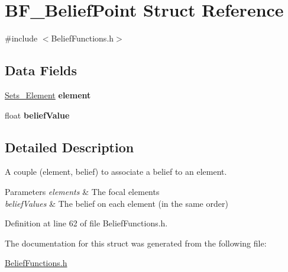 \hypertarget{struct_b_f___belief_point}{
\section{BF\_\-BeliefPoint Struct Reference}
\label{struct_b_f___belief_point}
}


{\ttfamily \#include $<$BeliefFunctions.h$>$}

\subsection*{Data Fields}
\begin{DoxyCompactItemize}
\item 
\hypertarget{struct_b_f___belief_point_a9a710ad49ddbc706371fa96ab1d1a4fa}{
\hyperlink{struct_sets___element}{Sets\_\-Element} {\bfseries element}}
\label{struct_b_f___belief_point_a9a710ad49ddbc706371fa96ab1d1a4fa}

\item 
\hypertarget{struct_b_f___belief_point_a59bb288073cdc2754b6d0ebc93b478d0}{
float {\bfseries beliefValue}}
\label{struct_b_f___belief_point_a59bb288073cdc2754b6d0ebc93b478d0}

\end{DoxyCompactItemize}


\subsection{Detailed Description}
A couple (element, belief) to associate a belief to an element. 
\begin{DoxyParams}{Parameters}
{\em elements} & The focal elements \\
\hline
{\em beliefValues} & The belief on each element (in the same order) \\
\hline
\end{DoxyParams}


Definition at line 62 of file BeliefFunctions.h.



The documentation for this struct was generated from the following file:\begin{DoxyCompactItemize}
\item 
\hyperlink{_belief_functions_8h}{BeliefFunctions.h}\end{DoxyCompactItemize}

